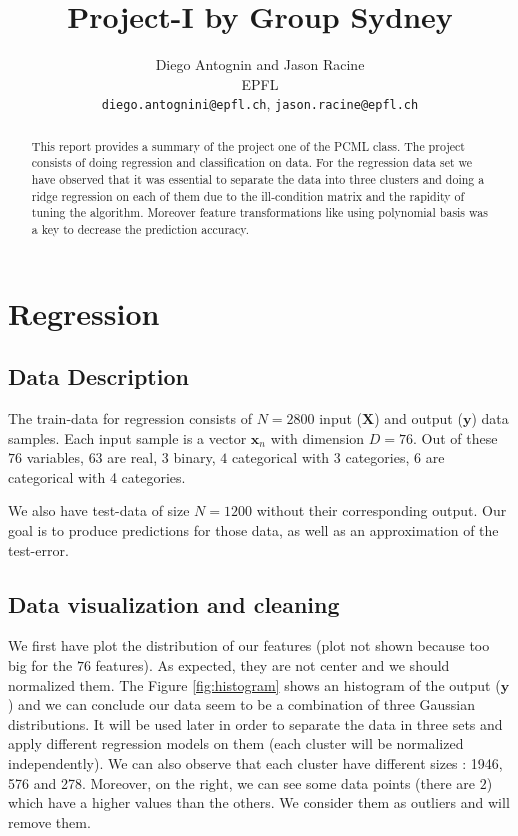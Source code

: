 \documentclass{article} %
\title{Project-I by Group Sydney}
\author{
Diego Antognin and Jason Racine \\
EPFL \\
\texttt{diego.antognini@epfl.ch}, \texttt{jason.racine@epfl.ch} \\
}
\begin{document}
\maketitle

\begin{abstract}
This report provides a summary of the project one of the PCML class. The project consists of doing regression and classification on data. For the regression data set we have observed that it was essential to separate the data into three clusters and doing a ridge regression on each of them due to the ill-condition matrix and the rapidity of tuning the algorithm. Moreover feature transformations like using polynomial basis was a key to decrease the prediction accuracy.
\end{abstract}

\section{Regression}

\subsection{Data Description}

The train-data for regression consists of $N = 2800$ input ($\mathbf{X}$) and output ($\mathbf{y}$) data samples. Each input sample is a vector $\mathbf{x}_n$ with dimension $D = 76$. Out of these $76$ variables, $63$ are real, $3$ binary, $4$ categorical with 3 categories, $6$ are categorical with 4 categories.

We also have test-data of size $N=1200$ without their corresponding output. Our goal is to produce predictions for those data, as well as an approximation of the test-error.

\subsection{Data visualization and cleaning}

We first have plot the distribution of our features (plot not shown because too big for the $76$ features). As expected, they are not center and we should normalized them. The Figure \ref{fig:histogram} shows an histogram of the output ($\mathbf{y}$) and we can conclude our data  seem to be a combination of three Gaussian distributions. It will be used later in order to separate the data in three sets and apply different regression models on them (each cluster will be normalized independently). We can also observe that each cluster have different sizes : 1946, 576 and 278. Moreover, on the right, we can see some data points (there are $2$) which have a higher values than the others. We consider them as outliers and will remove them.
\end{document}
